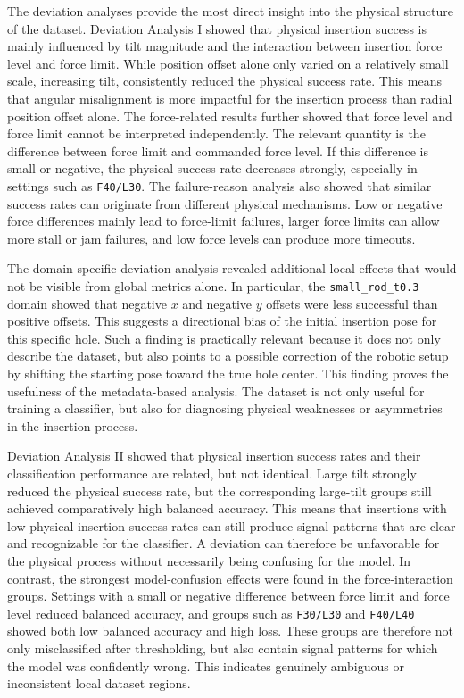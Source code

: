 The deviation analyses provide the most direct insight into the physical structure of the dataset. Deviation Analysis I showed that physical insertion success is mainly influenced by tilt magnitude and the interaction between insertion force level and force limit. While position offset alone only varied on a relatively small scale, increasing tilt, consistently reduced the physical success rate. This means that angular misalignment is more impactful for the insertion process than radial position offset alone. The force-related results further showed that force level and force limit cannot be interpreted independently. The relevant quantity is the difference between force limit and commanded force level. If this difference is small or negative, the physical success rate decreases strongly, especially in settings such as \texttt{F40/L30}. The failure-reason analysis also showed that similar success rates can originate from different physical mechanisms. Low or negative force differences mainly lead to force-limit failures, larger force limits can allow more stall or jam failures, and low force levels can produce more timeouts.

The domain-specific deviation analysis revealed additional local effects that would not be visible from global metrics alone. In particular, the \texttt{small\_rod\_t0.3} domain showed that negative $x$ and negative $y$ offsets were less successful than positive offsets. This suggests a directional bias of the initial insertion pose for this specific hole. Such a finding is practically relevant because it does not only describe the dataset, but also points to a possible correction of the robotic setup by shifting the starting pose toward the true hole center. This finding proves the usefulness of the metadata-based analysis. The dataset is not only useful for training a classifier, but also for diagnosing physical weaknesses or asymmetries in the insertion process.

Deviation Analysis II showed that physical insertion success rates and their classification performance are related, but not identical. Large tilt strongly reduced the physical success rate, but the corresponding large-tilt groups still achieved comparatively high balanced accuracy. This means that insertions with low physical insertion success rates can still produce signal patterns that are clear and recognizable for the classifier. A deviation can therefore be unfavorable for the physical process without necessarily being confusing for the model. In contrast, the strongest model-confusion effects were found in the force-interaction groups. Settings with a small or negative difference between force limit and force level reduced balanced accuracy, and groups such as \texttt{F30/L30} and \texttt{F40/L40} showed both low balanced accuracy and high loss. These groups are therefore not only misclassified after thresholding, but also contain signal patterns for which the model was confidently wrong. This indicates genuinely ambiguous or inconsistent local dataset regions.

